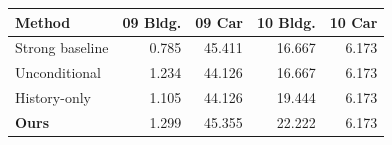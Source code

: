 \begin{tabular}{lrrrr}
\toprule
Method & 09 Bldg. & 09 Car & 10 Bldg. & 10 Car \\
\midrule
Strong baseline & 0.785 & 45.411 & 16.667 & 6.173 \\
Unconditional & 1.234 & 44.126 & 16.667 & 6.173 \\
History-only & 1.105 & 44.126 & 19.444 & 6.173 \\
\textbf{Ours} & 1.299 & 45.355 & 22.222 & 6.173 \\
\bottomrule
\end{tabular}
